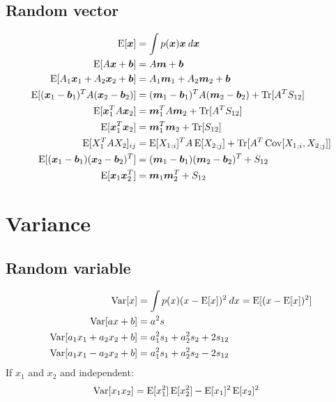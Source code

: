 \documentclass[a4paper]{article}
\begin{document}
\subsection{Random vector}
\begin{align*}
  \Exp{\bs{x}} &= \int p(\bs{x}) \bs{x} \: d\bs{x} \\
  \Exp{A \bs{x} + \bs{b}} &= A \bs{m} + \bs{b} \\
  \Exp{A_1 \bs{x}_1 + A_2 \bs{x}_2 + \bs{b}} &= A_1 \bs{m}_1 + A_2 \bs{m}_2 + \bs{b} \\
  \Exp{(\bs{x}_1 - \bs{b}_1)^T A (\bs{x}_2 - \bs{b}_2)} &= (\bs{m}_1 - \bs{b}_1)^T A (\bs{m}_2 - \bs{b}_2) + \Tr{A^T S_{12}} \\
  \Exp{\bs{x}_1^T A \bs{x}_2} &= \bs{m}_1^T A \bs{m}_2 + \Tr{A^T S_{12}} \\
  \Exp{\bs{x}_1^T \bs{x}_2} &= \bs{m}_1^T \bs{m}_2 + \Tr{S_{12}} \\
  \Exp{X_1^T A X_2}_{ij} &= \Exp{{X_1}_{:i}}^T A \Exp{{X_2}_{:j}} + \Tr{A^T \Cov{{X_1}_{:i}, {X_2}_{:j}}} \\
  \Exp{(\bs{x}_1 - \bs{b}_1) (\bs{x}_2 - \bs{b}_2)^T} &= (\bs{m}_1 - \bs{b}_1) (\bs{m}_2 - \bs{b}_2)^T + S_{12} \\
  \Exp{\bs{x}_1 \bs{x}_2^T} &= \bs{m}_1 \bs{m}_2^T + S_{12} \\
\end{align*}
\newpage

\section{Variance}
\subsection{Random variable}
\begin{align*}
  \Var{x} &= \int p(x) (x-\Exp{x})^2 \: dx = \Exp{(x-\Exp{x})^2} \\
  \Var{ax + b} &= a^2 s \\
  \Var{a_1 x_1 + a_2 x_2 + b} &= a_1^2 s_1 + a_2^2 s_2 + 2 s_{12} \\
  \Var{a_1 x_1 - a_2 x_2 + b} &= a_1^2 s_1 + a_2^2 s_2 - 2 s_{12} \\
\end{align*}
If $x_1$ and $x_2$ and independent:
\begin{align*}
  \Var{x_1 x_2} &= \Exp{x_1^2} \Exp{x_2^2} - \Exp{x_1}^2 \Exp{x_2}^2
\end{align*}
\end{document}
